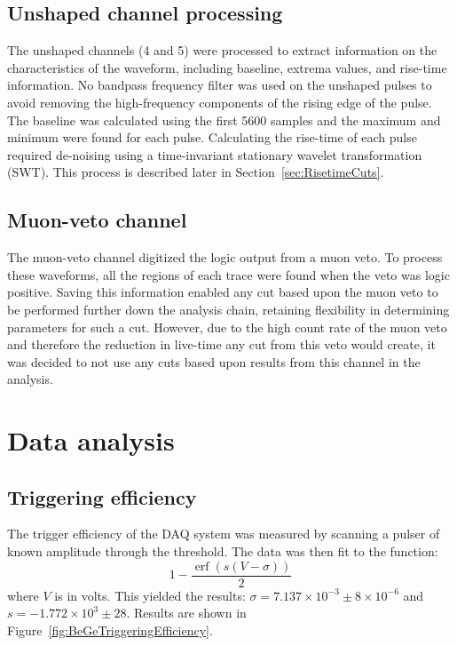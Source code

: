 		\subsection{Unshaped channel processing}
		\label{sec:UnshapedWFProc}

The unshaped channels (4 and 5) were processed to extract information on the characteristics of the waveform, including baseline, extrema values, and rise-time information.  No bandpass frequency filter was used on the unshaped pulses to avoid removing the high-frequency components of the rising edge of the pulse.  The baseline was calculated using the first 5600 samples and the maximum and minimum were found for each pulse.  Calculating the rise-time of each pulse required de-noising using a time-invariant stationary wavelet transformation (SWT).  This process is described later in Section~\ref{sec:RisetimeCuts}.

		\subsection{Muon-veto channel}
		\label{sec:MuonProc}

The muon-veto channel digitized the logic output from a muon veto.  To process these waveforms, all the regions of each trace were found when the veto was logic positive.  Saving this information enabled any cut based upon the muon veto to be performed further down the analysis chain, retaining flexibility in determining parameters for such a cut.  However, due to the high count rate of the muon veto and therefore the reduction in live-time any cut from this veto would create, it was decided to not use any cuts based upon results from this channel in the analysis.


	\section{Data analysis}
	\label{sec:BeGeDataAnalysis}
		\subsection{Triggering efficiency}
		\label{sec:BeGeTrigEff}

The trigger efficiency of the DAQ system was measured by scanning a pulser of known amplitude through the threshold.  The data was then fit to the function:
			\[
			1 - \frac{\operatorname{erf} \left(s(V-\sigma)\right)}{2}
			\]
where $V$ is in volts.  This yielded the results: $\sigma = 7.137\times10^{-3}\pm8\times10^{-6}$ and $s = -1.772\times10^{3}\pm28$.  Results are shown in Figure~\ref{fig:BeGeTriggeringEfficiency}.

